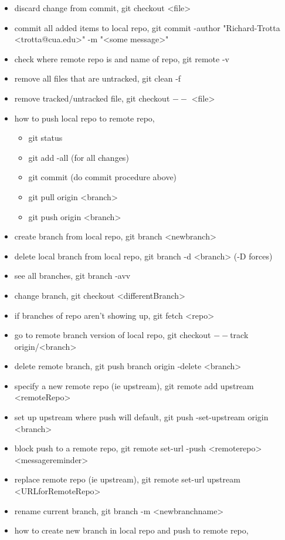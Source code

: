 \documentclass[11pt]{article}
\begin{document}
\begin{itemize}
\item discard change from commit, git checkout <file>
\item commit all added items to local repo, git commit -author "Richard-Trotta <trotta@cua.edu>" -m "<some message>"
\item check where remote repo is and name of repo, git remote -v
\item remove all files that are untracked, git clean -f
\item remove tracked/untracked file, git checkout \(--\) <file>
\item how to push local repo to remote repo,
\begin{itemize}
\item git status
\item git add -all (for all changes)
\item git commit (do commit procedure above)
\item git pull origin <branch>
\item git push origin <branch>
\end{itemize}
\item create branch from local repo, git branch <newbranch>
\item delete local branch from local repo, git branch -d <branch> (-D forces)
\item see all branches, git branch -avv
\item change branch, git checkout <differentBranch>
\item if branches of repo aren't showing up, git fetch <repo>
\item go to remote branch version of local repo, git checkout \(--\)track origin/<branch>
\item delete remote branch, git push branch origin 	-delete <branch>
\item specify a new remote repo (ie upstream), git remote add upstream <remoteRepo>
\item set up upstream where push will default, git push -set-upstream origin <branch>
\item block push to a remote repo, git remote set-url -push <remoterepo> <messagereminder>
\item replace remote repo (ie upstream), git remote set-url upstream <URLforRemoteRepo>
\item rename current branch, git branch -m <newbranchname>
\item how to create new branch in local repo and push to remote repo,
\begin{itemize}

\end{itemize}
\end{itemize}
\end{document}

